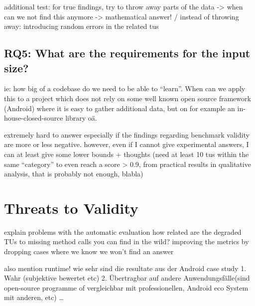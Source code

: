 additional test:
	for true findings, try to throw away parts of the data -> when can we not find this anymore -> mathematical answer!
    / instead of throwing away: introducing random errors in the related tus

\subsection{RQ5: What are the requirements for the input size?}
ie: how big of a codebase do we need to be able to ``learn''. When can we apply this to a project which does not rely on some well known open source framework (Android) where it is easy to gather additional data, but on for example an in-house-closed-source library oä.

extremely hard to answer especially if the findings regarding benchmark validity are more or less negative.
however, even if I cannot give experimental answers, I can at least give some lower bounds + thoughts
(need at least 10 tus within the same ``category'' to even reach a score > 0.9, from practical results in qualitative analysis, that is probably not enough, blabla)

\section{Threats to Validity}

explain problems with the automatic evaluation
how related are the degraded TUs to missing method calls you can find in the wild?
improving the metrics by dropping cases where we know we won't find an answer

also mention runtime!
wie sehr sind die resultate aus der Android case study 1. Wahr (subjektive bewertet etc) 2. Übertragbar auf andere Anwendungsfälle(sind open-source programme of vergleichbar mit professionellen, Android eco System mit anderen, etc)
\ldots
